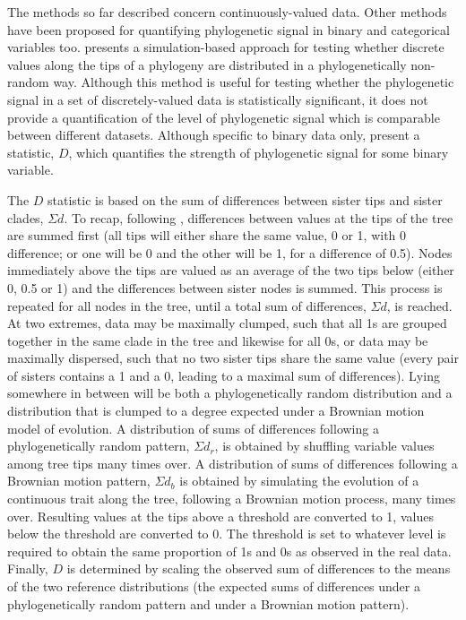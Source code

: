 The methods so far described concern continuously-valued data. Other methods have been proposed for quantifying phylogenetic signal in binary and categorical variables too. \textcite{abouheif_method_1999} presents a simulation-based approach for testing whether discrete values along the tips of a phylogeny are distributed in a phylogenetically non-random way. Although this method is useful for testing whether the phylogenetic signal in a set of discretely-valued data is statistically significant, it does not provide a quantification of the level of phylogenetic signal which is comparable between different datasets. Although specific to binary data only, \textcite{fritz_selectivity_2010} present a statistic, \(D\), which quantifies the strength of phylogenetic signal for some binary variable.

The \(D\) statistic is based on the sum of differences between sister tips and sister clades, \(\Sigma d\). To recap, following \textcite{fritz_selectivity_2010}, differences between values at the tips of the tree are summed first (all tips will either share the same value, 0 or 1, with 0 difference; or one will be 0 and the other will be 1, for a difference of 0.5). Nodes immediately above the tips are valued as an average of the two tips below (either 0, 0.5 or 1) and the differences between sister nodes is summed. This process is repeated for all nodes in the tree, until a total sum of differences, \(\Sigma d\), is reached. At two extremes, data may be maximally clumped, such that all 1s are grouped together in the same clade in the tree and likewise for all 0s, or data may be maximally dispersed, such that no two sister tips share the same value (every pair of sisters contains a 1 and a 0, leading to a maximal sum of differences). Lying somewhere in between will be both a phylogenetically random distribution and a distribution that is clumped to a degree expected under a Brownian motion model of evolution. A distribution of sums of differences following a phylogenetically random pattern, \(\Sigma d_r\), is obtained by shuffling variable values among tree tips many times over. A distribution of sums of differences following a Brownian motion pattern, \(\Sigma d_b\) is obtained by simulating the evolution of a continuous trait along the tree, following a Brownian motion process, many times over. Resulting values at the tips above a threshold are converted to 1, values below the threshold are converted to 0. The threshold is set to whatever level is required to obtain the same proportion of 1s and 0s as observed in the real data. Finally, \(D\) is determined by scaling the observed sum of differences to the means of the two reference distributions (the expected sums of differences under a phylogenetically random pattern and under a Brownian motion pattern).

